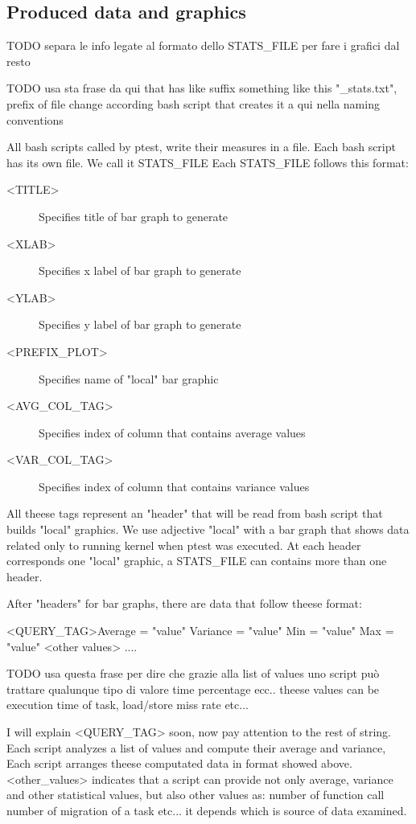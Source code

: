 \documentclass[a4paper,10pt]{article}
\begin{document}
\begin{multicols}{2}
\section{Produced data and graphics}

TODO separa le info legate al formato dello STATS\_FILE per fare i grafici 
dal resto

TODO usa sta frase da qui that has like
suffix something like this "\_stats.txt", prefix of file change according bash 
script that creates it a qui nella naming conventions

All bash scripts called by ptest, write their measures in a file. Each bash script 
has its own file. We call it STATS\_FILE 
Each STATS\_FILE follows this format:

\begin{description}
	\item[<TITLE>] Specifies title of bar graph to generate
	\item[<XLAB>] Specifies x label of bar graph to generate
	\item[<YLAB>] Specifies y label of bar graph to generate
	\item[<PREFIX\_PLOT>] Specifies name of "local" bar graphic
	\item[<AVG\_COL\_TAG>] Specifies index of column that contains average values
	\item[<VAR\_COL\_TAG>] Specifies index of column that contains variance values
\end{description}

All theese tags represent an "header" that will be read from bash script that builds 
"local" graphics. We use adjective "local" with a bar graph that shows data related only to 
running kernel when ptest was executed. At each header corresponds one "local" 
graphic, a STATS\_FILE can contains more than one header. 

After "headers" for bar graphs, there are data that follow theese format:

<QUERY\_TAG>Average = "value" Variance = "value" Min = "value" Max = "value" <other values>
....

TODO usa questa frase per dire che grazie alla list of values uno script può trattare
qualunque tipo di valore time percentage ecc..
theese values can be execution time of task, load/store miss rate etc...

I will explain <QUERY\_TAG> soon, now pay attention to the rest of string.
Each script analyzes a list of values and compute their average and variance,
Each script arranges theese computated data in format showed above.
<other_values> indicates that a script can provide not only average, variance and 
other statistical values, but also other values as: number of function call
number of migration of a task etc... it depends which is source of data examined.



\end{multicols}
\end{document}
